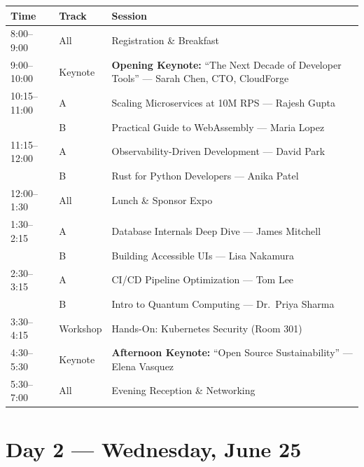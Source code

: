 \documentclass[
    language=english,
    doctype=program,
    institution=none,
]{../../omnilatex}
\begin{document}
\begin{tabularx}{\textwidth}{l l X}
    \toprule
    \textbf{Time} & \textbf{Track} & \textbf{Session} \\
    \midrule
    8:00--9:00   & All      & Registration \& Breakfast \\
    9:00--10:00  & Keynote  & \textbf{Opening Keynote:} ``The Next Decade of Developer Tools''
                             --- Sarah Chen, CTO, CloudForge \\
    10:15--11:00 & A        & Scaling Microservices at 10M RPS --- Rajesh Gupta \\
                 & B        & Practical Guide to WebAssembly --- Maria Lopez \\
    11:15--12:00 & A        & Observability-Driven Development --- David Park \\
                 & B        & Rust for Python Developers --- Anika Patel \\
    12:00--1:30  & All      & Lunch \& Sponsor Expo \\
    1:30--2:15   & A        & Database Internals Deep Dive --- James Mitchell \\
                 & B        & Building Accessible UIs --- Lisa Nakamura \\
    2:30--3:15   & A        & CI/CD Pipeline Optimization --- Tom Lee \\
                 & B        & Intro to Quantum Computing --- Dr.\ Priya Sharma \\
    3:30--4:15   & Workshop & Hands-On: Kubernetes Security (Room 301) \\
    4:30--5:30   & Keynote  & \textbf{Afternoon Keynote:} ``Open Source Sustainability''
                             --- Elena Vasquez \\
    5:30--7:00   & All      & Evening Reception \& Networking \\
    \bottomrule
\end{tabularx}

\vspace{0.5em}

\section*{Day 2 --- Wednesday, June 25}
\end{document}

